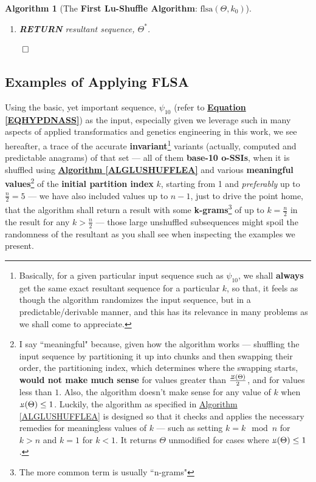 \documentclass[a4paper, 18pt]{book} %
\newtheorem{alg}{Algorithm}
\newcommand{\invpi}{\rotatebox[origin=c]{180}{$\pi$}}
\begin{document}
\begin{alg}[The \textbf{First Lu-Shuffle Algorithm}: $\text{flsa}(\Theta, k_0)$]
\begin{enumerate}
{\begin{enumerate}
	\item \textbf{INCREMENT} $k$: $k = k + 1$
\end{enumerate}
}
\item \textbf{RETURN} resultant sequence, $\Theta^*$.
\end{enumerate}
$\qed$
\end{alg}


\subsection{Examples of Applying FLSA}
\label{SECAPPLYFLSA}

Using the basic, yet important sequence, $\psi_{10}$ (refer to \textbf{\hyperref[EQHYPDNASS]{Equation \ref{EQHYPDNASS}}}) as the input, especially given we leverage such in many aspects of applied transformatics and genetics engineering in this work, we see hereafter, a trace of the accurate \textbf{invariant}\footnote{Basically, for a given particular input sequence such as $\psi_{10}$, we shall \textbf{always} get the same exact resultant sequence for a particular $k$, so that, it feels as though the algorithm randomizes the input sequence, but in a predictable/derivable manner, and this has its relevance in many problems as we shall come to appreciate.} variants (actually, computed and predictable anagrams) of that set --- all of them \textbf{base-10 o-SSIs}\cite{ossipaper}, when it is shuffled using \textbf{\hyperref[ALGLUSHUFFLEA]{Algorithm \ref{ALGLUSHUFFLEA}}} and various \textbf{meaningful values}\footnote{I say ``meaningful" because, given how the algorithm works --- shuffling the input sequence by partitioning it up into chunks and then swapping their order, the partitioning index, which determines where the swapping starts, \textbf{would not make much sense} for values greater than $\frac{\invpi(\Theta)}{2}$, and for values less than $1$. Also, the algorithm doesn't make sense for any value of $k$ when $\invpi(\Theta) \leq 1$. Luckily, the algorithm as specified in \hyperref[ALGLUSHUFFLEA]{Algorithm \ref{ALGLUSHUFFLEA}} is designed so that it checks and applies the necessary remedies for meaningless values of $k$ --- such as setting $k = k \mod n$ for $k > n$ and $k=1$ for $k < 1$. It returns $\Theta$ unmodified for cases where $\invpi(\Theta) \leq 1$.} of the \textbf{initial partition index} $k$, starting from 1 and \textit{preferably} up to $\frac{n}{2} = 5$ --- we have also included values up to $n-1$, just to drive the point home, that the algorithm shall return a result with some \textbf{k-grams}\footnote{The more common term is usually ``n-grams"} of up to $k = \frac{n}{2}$ in the result for any $k > \frac{n}{2}$ --- those large unshuffled subsequences might spoil the randomness of the resultant as you shall see when inspecting the examples we present. 
\end{document}
